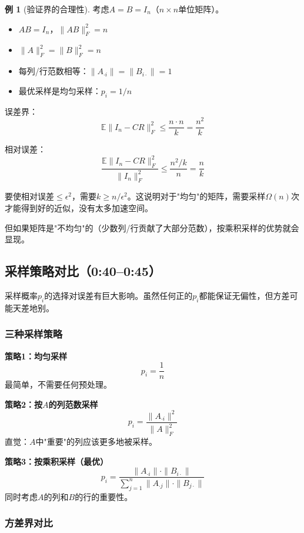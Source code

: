 \documentclass[11pt,a4paper]{ctexart}
\theoremstyle{definition}
\newtheorem{example}[theorem]{例}
\theoremstyle{remark}
\begin{document}
\begin{example}[验证界的合理性]
考虑$A = B = I_n$（$n \times n$单位矩阵）。

\begin{itemize}
    \item $AB = I_n$，$\|AB\|_F^2 = n$
    \item $\|A\|_F^2 = \|B\|_F^2 = n$
    \item 每列/行范数相等：$\|A_{\cdot i}\| = \|B_{i\cdot}\| = 1$
    \item 最优采样是均匀采样：$p_i = 1/n$
\end{itemize}

误差界：
\[
\mathbb{E}\|I_n - CR\|_F^2 \leq \frac{n \cdot n}{k} = \frac{n^2}{k}
\]

相对误差：
\[
\frac{\mathbb{E}\|I_n - CR\|_F^2}{\|I_n\|_F^2} \leq \frac{n^2/k}{n} = \frac{n}{k}
\]

要使相对误差$\leq \epsilon^2$，需要$k \geq n/\epsilon^2$。这说明对于"均匀"的矩阵，需要采样$\Omega(n)$次才能得到好的近似，没有太多加速空间。

但如果矩阵是"不均匀"的（少数列/行贡献了大部分范数），按乘积采样的优势就会显现。
\end{example}
\subsection{采样策略对比（0:40--0:45）}

采样概率$p_i$的选择对误差有巨大影响。虽然任何正的$p_i$都能保证无偏性，但方差可能天差地别。

\subsubsection{三种采样策略}

\textbf{策略1：均匀采样}
\[
p_i = \frac{1}{n}
\]
最简单，不需要任何预处理。

\textbf{策略2：按$A$的列范数采样}
\[
p_i = \frac{\|A_{\cdot i}\|^2}{\|A\|_F^2}
\]
直觉：$A$中"重要"的列应该更多地被采样。

\textbf{策略3：按乘积采样（最优）}
\[
p_i = \frac{\|A_{\cdot i}\| \cdot \|B_{i \cdot}\|}{\sum_{j=1}^n \|A_{\cdot j}\| \cdot \|B_{j \cdot}\|}
\]
同时考虑$A$的列和$B$的行的重要性。

\subsubsection{方差界对比}
\end{document}
